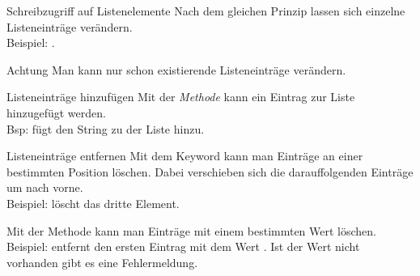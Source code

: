 \begin{frame}
\begin{block}{Schreibzugriff auf Listenelemente}
\vspace{2pt}
Nach dem gleichen Prinzip lassen sich einzelne Listeneinträge verändern. \\
Beispiel: . 
\end{block}

\pause 
\vspace{12pt}



\begin{alertblock}{Achtung}
\vspace{2pt}
Man kann nur schon existierende Listeneinträge verändern. 
\end{alertblock}

\pause 
\vspace{12pt}

\end{frame}


\begin{frame}
\begin{block}{Listeneinträge hinzufügen}
	\vspace{2pt}
	Mit der \emph{Methode}  kann ein Eintrag zur Liste hinzugefügt werden. \\ 
	Bsp:  fügt den String  zu der Liste hinzu. 
\end{block}	

\pause 
\vspace{12pt}


\begin{block}{Listeneinträge entfernen}
	\pause 
\vspace{2pt}
Mit dem Keyword  kann man Einträge an einer bestimmten Position löschen. Dabei verschieben sich die darauffolgenden Einträge um  nach vorne. \\
Beispiel:  löscht das dritte Element.  

\pause 

Mit der Methode  kann man Einträge mit einem bestimmten Wert löschen. \\
Beispiel:  entfernt den ersten Eintrag mit dem Wert . Ist der Wert nicht vorhanden gibt es eine Fehlermeldung. 
\end{block}
\end{frame}

